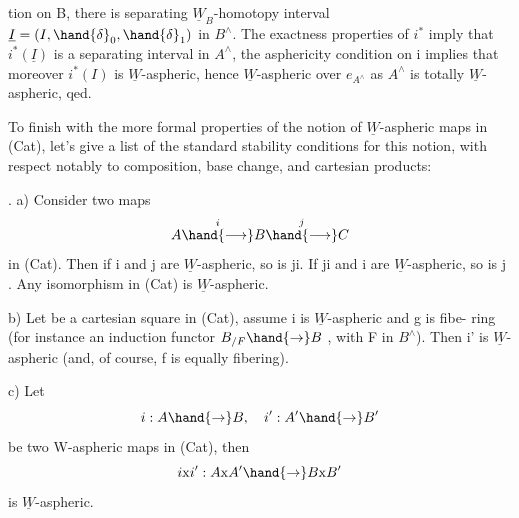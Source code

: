 
tion on B,  there is   separating $\underline{W}_B$-homotopy interval
$\underline{I} = (I,\hand{\delta}_0,\hand{\delta}_1)$ in $B^\wedge$.  The exactness properties of $i^*$  imply that
$i^*(\underline{I})$  is a separating interval in $A^\wedge$,   the asphericity condition on
i implies that moreover $i^*(I)$ is $\underline{W}$-aspheric,  hence $\underline{W}$-aspheric over $e_{A^\wedge}$
as $A^\wedge$ is  totally $\underline{W}$-aspheric,  qed.

To finish  with the more formal properties of the notion of
$\underline{W}$-aspheric maps in (Cat),  let's give a list of the standard stability
conditions for this notion,  with respect notably to composition,  base
change,  and cartesian products:

\hand{\uline{\textcolor{black}{Proposition 3}}}.   a)  Consider two maps  
\[ A \overset{i}{\hand{\longrightarrow}} B \overset{j}{\hand{\longrightarrow}} C \]
in (Cat).   Then if  i and j are $\underline{W}$-aspheric,  so is ji.  If ji and i are
$\underline{W}$-aspheric,  so is j .  Any isomorphism in (Cat) is $\underline{W}$-aspheric.

b)   Let
be a cartesian square in (Cat),  assume i is $\underline{W}$-aspheric and g is fibe-%
ring  (for instance an induction functor  $B_{/F} \hand{\to} B$ ,  with  F in $B^\wedge$).
Then i' is $\underline{W}$-aspheric  (and, of course,  f is equally fibering).

c)   Let
\[ i: A \hand{\to} B , \quad i' : A' \hand{\to} B' \]
be two W-aspheric maps in (Cat),  then
\[ i\mathrm{x}i' : A\mathrm{x}A' \hand{\to} B\mathrm{x}B' \]
is $\underline{W}$-aspheric.

